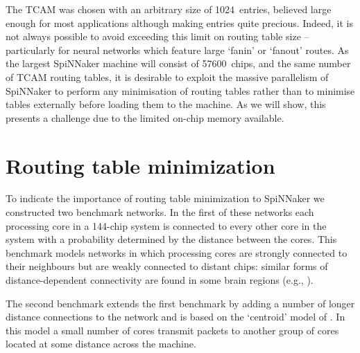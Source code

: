 \documentclass[conference]{IEEEtran}
\begin{document}
The TCAM was chosen with an arbitrary size of \num{1024}~entries, believed large enough for most applications although making entries quite precious.
Indeed, it is not always possible to avoid exceeding this limit on routing table size -- particularly for neural networks which feature large `fanin' or `fanout' routes.
As the largest SpiNNaker machine will consist of \num{57600}~chips, and the same number of TCAM routing tables, it is desirable to exploit the massive parallelism of SpiNNaker to perform any minimisation of routing tables rather than to minimise tables externally before loading them to the machine. As we will show, this presents a challenge due to the limited on-chip memory available.

\section{Routing table minimization}

To indicate the importance of routing table minimization to SpiNNaker we constructed two benchmark networks.
In the first of these networks each processing core in a 144-chip system is connected to every other core in the system with a probability determined by the distance between the cores.
This benchmark models networks in which processing cores are strongly connected to their neighbours but are weakly connected to distant chips:
similar forms of distance-dependent connectivity are found in some brain regions (e.g., \parencite{Hellwig2000}).

The second benchmark extends the first benchmark by adding a number of longer distance connections to the network and is based on the `centroid' model of \textcite{Navaridas2015}.
In this model a small number of cores transmit packets to another group of cores located at some distance across the machine.

\end{document}
